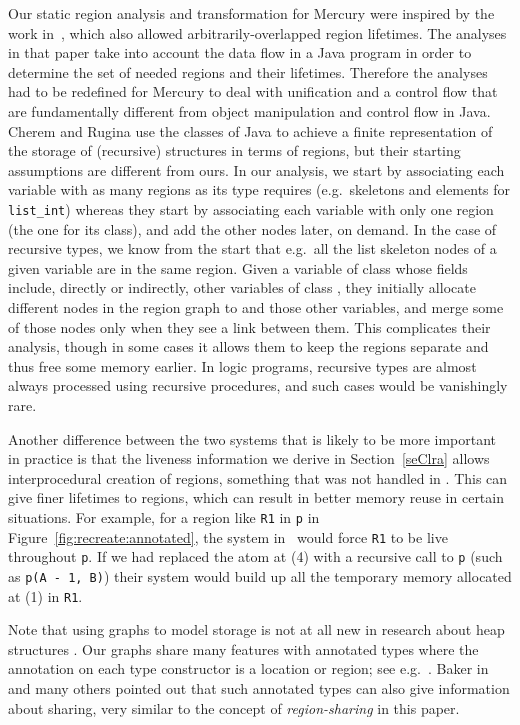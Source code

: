 \documentclass{tlp}
\newcommand{\code}[1]{{\tt#1}}
\begin{document}
Our static region analysis and transformation for Mercury
were inspired by the work in~\cite{Cherem04},
which also allowed arbitrarily-overlapped region lifetimes.
The analyses in that paper take into account
the data flow in a Java program
in order to determine the set of needed regions and their lifetimes.
Therefore the analyses had to be
redefined for Mercury to deal with unification and a control flow that are
fundamentally different from object manipulation and control flow in Java.
Cherem and Rugina use the classes of Java
to achieve a finite representation of the storage of (recursive) structures
in terms of regions,
but their starting assumptions are different from ours.
In our analysis,
we start by associating each variable with as many regions
as its type requires (e.g.\ skeletons and elements for \code{list\_int})
whereas they start by associating each variable with only one region
(the one for its class),
and add the other nodes later, on demand.
In the case of recursive types,
we know from the start that e.g.\ all the list skeleton nodes
of a given variable are in the same region.
Given a variable  of class  whose fields include,
directly or indirectly, other variables of class ,
they initially allocate different nodes in the region graph
to  and those other variables,
and merge some of those nodes only when they see a link between them.
This complicates their analysis,
though in some cases it allows them to keep the regions separate
and thus free some memory earlier.
In logic programs, recursive types
are almost always processed using recursive procedures,
and such cases would be vanishingly rare.

Another difference between the two systems
that is likely to be more important in practice
is that the liveness information we derive in Section~\ref{seClra}
allows interprocedural creation of regions,
something that was not handled in \cite{Cherem04}.
This can give finer lifetimes to regions,
which can result in better memory reuse in certain situations.
For example, for a region like \code{R1} in \code{p}
in Figure~\ref{fig:recreate:annotated},
the system in~\cite{Cherem04}
would force \code{R1} to be live throughout \code{p}.
If we had replaced the atom at (4) with a recursive call to \code{p}
(such as \code{p(A - 1, B)})
their system would build up
all the temporary memory allocated at (1) in \code{R1}.

Note that using graphs to model storage is not at all new
in research about heap structures \cite{Chase90,Steensgaard96}.
Our graphs share many features with annotated types
where the annotation on each type constructor
is a location or region; see e.g.\ \cite{Baker90,TofteTalpin97}.
Baker in~\cite{Baker90} and many others pointed out that
such annotated types can also give information about sharing,
very similar to the concept of \emph{region-sharing} in this paper.
\end{document}
